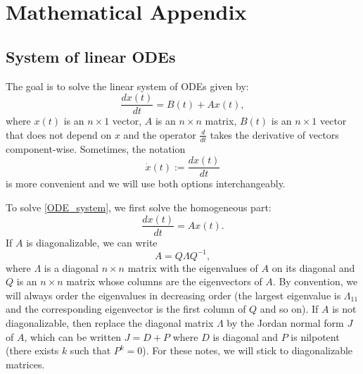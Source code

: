 \documentclass[../../lecture_notes.tex]{subfiles}
\begin{document}
\section{Mathematical Appendix}
\subsection{System of linear ODEs}
The goal is to solve the linear system of ODEs given by:
\begin{equation}
  \frac{dx(t)}{dt}=B(t)+Ax(t),
  \label{ODE_system}
\end{equation}
where \(x(t)\) is an \(n\times 1\) vector, \(A\) is an \(n\times n\) matrix, \(B(t)\) is an \(n\times 1\) vector that does not depend on \(x\) and the operator \(\frac{d}{dt}\) takes the derivative of vectors component-wise.
Sometimes, the notation
\begin{equation*}
  \dot{x}(t):= \frac{dx(t)}{dt}
\end{equation*}
is more convenient and we will use both options interchangeably.

To solve \eqref{ODE_system}, we first solve the homogeneous part:
\begin{equation}
  \frac{dx(t)}{dt}=Ax(t).
  \label{ODE_homogeneous}
\end{equation}
If \(A\) is diagonalizable, we can write
\begin{equation*}
  A=Q\Lambda Q^{-1},
\end{equation*}
where \(\Lambda\) is a diagonal \(n\times n\) matrix with the eigenvalues of \(A\) on its diagonal and \(Q\) is an \(n\times n\) matrix whose columns are the eigenvectors of \(A\).
By convention, we will always order the eigenvalues in decreasing order (the largest eigenvalue is \(\Lambda_{11}\) and the corresponding eigenvector is the first column of \(Q\) and so on).
If \(A\) is not diagonalizable, then replace the diagonal matrix \(\Lambda\) by the Jordan normal form \(J\) of \(A\), which can be written \(J=D+P\) where \(D\) is diagonal and \(P\) is nilpotent (there exists \(k\) such that \(P^{k}=0\)).
For these notes, we will stick to diagonalizable matrices.
\end{document}
